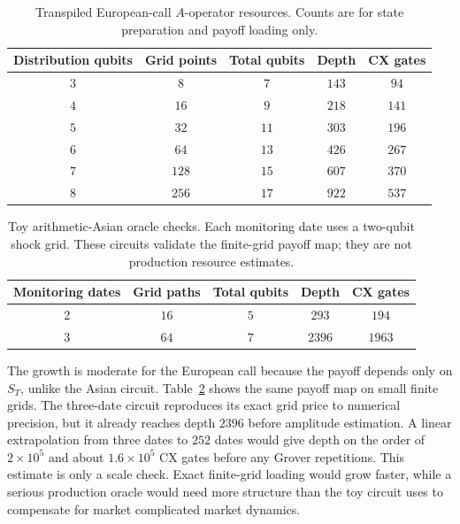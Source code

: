 \documentclass[12pt]{article}
\begin{document}
\begin{table}[H]
    \centering
    \caption{Transpiled European-call $A$-operator resources.  Counts are for state preparation and payoff loading only.}
    \label{tab:european-resources}
    \begin{tabular}{ccccc}
        \toprule
        Distribution qubits & Grid points & Total qubits & Depth & CX gates \\
        \midrule
        $3$ & $8$   & $7$  & $143$ & $94$  \\
        $4$ & $16$  & $9$  & $218$ & $141$ \\
        $5$ & $32$  & $11$ & $303$ & $196$ \\
        $6$ & $64$  & $13$ & $426$ & $267$ \\
        $7$ & $128$ & $15$ & $607$ & $370$ \\
        $8$ & $256$ & $17$ & $922$ & $537$ \\
        \bottomrule
    \end{tabular}
\end{table}

\begin{table}[H]
    \centering
    \caption{Toy arithmetic-Asian oracle checks.  Each monitoring date uses a two-qubit shock grid.  These circuits validate the finite-grid payoff map; they are not production resource estimates.}
    \label{tab:asian-toy-resources}
    \begin{tabular}{ccccc}
        \toprule
        Monitoring dates & Grid paths & Total qubits & Depth & CX gates \\
        \midrule
        $2$ & $16$ & $5$ & $293$  & $194$  \\
        $3$ & $64$ & $7$ & $2396$ & $1963$ \\
        \bottomrule
    \end{tabular}
\end{table}

The growth is moderate for the European call because the payoff depends only on $S_T$, unlike the Asian circuit.  Table~\ref{tab:asian-toy-resources} shows the same payoff map on small finite grids.  The three-date circuit reproduces its exact grid price to numerical precision, but it already reaches depth $2396$ before amplitude estimation.  A linear extrapolation from three dates to $252$ dates would give depth on the order of $2\times10^5$ and about $1.6\times10^5$ CX gates before any Grover repetitions.  This estimate is only a scale check.  Exact finite-grid loading would grow faster, while a serious production oracle would need more structure than the toy circuit uses to compensate for market complicated market dynamics.
\end{document}
